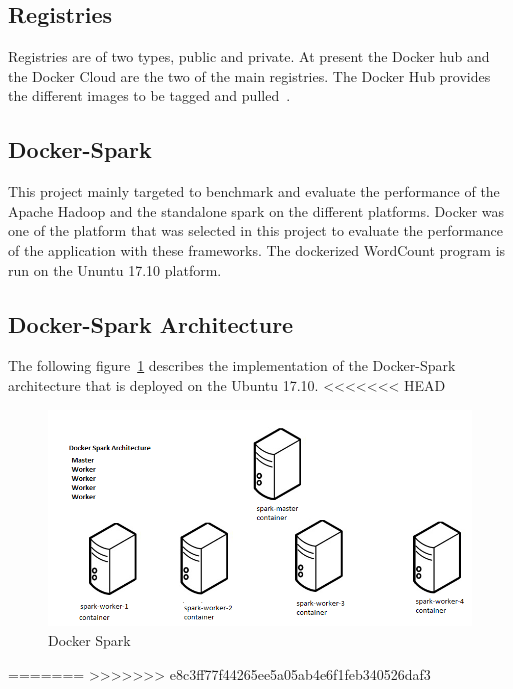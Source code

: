 \subsection{Registries}
Registries are of two types, public and private. 
At present the Docker hub and the Docker Cloud are 
the two of the main registries. The Docker 
Hub provides the different images to be tagged  
and pulled~\cite{hid-sp18-412-docker_wikepedia}.

\subsection{Docker-Spark}
This project mainly targeted to benchmark and evaluate 
the performance of the Apache Hadoop and the standalone 
spark on the different platforms. Docker was one of the 
platform that was selected in this project to 
evaluate the performance of the application with these frameworks.
The dockerized WordCount program is run on the Ununtu 17.10 platform. 

\subsection{Docker-Spark Architecture} 
The following figure~\ref{s:archidocker} describes the implementation of 
the Docker-Spark architecture that is deployed on the Ubuntu 17.10.
<<<<<<< HEAD

\begin{figure}[!ht]
\centering\includegraphics[width=\textwidth]{images/dockerspark.png}
\caption{Docker Spark}\label{sa:archidocker}\label{s:archidocker}
\end{figure}

=======
>>>>>>> e8c3ff77f44265ee5a05ab4e6f1feb340526daf3


